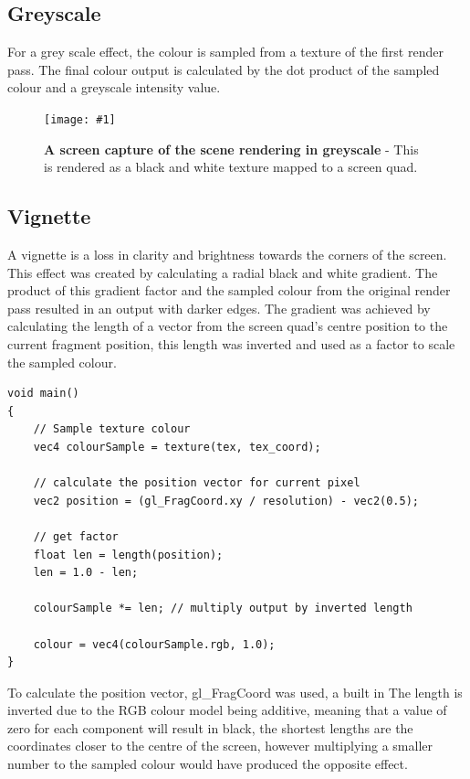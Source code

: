 \documentclass[conference]{acmsiggraph}
\newcommand{\figuremacroW}[4]{
	\begin{figure}[h] %
		\centering
		\texttt{[image: \#1]}
		\caption[#2]{\textbf{#2} - #3}
		\label{fig:#1}
	\end{figure}
}
\begin{document}
\subsection{Greyscale}

For a grey scale effect, the colour is sampled from a texture of the first render pass. The final colour output is calculated by the dot product of the sampled colour and a greyscale intensity value.

\figuremacroW
{greyscale}
{A screen capture of the scene rendering in greyscale}
{This is rendered as a black and white texture mapped to a screen quad.}
{1.0}

\subsection{Vignette}

A vignette is a loss in clarity and brightness towards the corners of the screen. This effect was created by calculating a radial black and white gradient. The product of this gradient factor and the sampled colour from the original render pass resulted in an output with darker edges. The gradient was achieved by calculating the length of a vector from the screen quad's centre position to the current fragment position, this length was inverted and used as a factor to scale the sampled colour. 

\begin{lstlisting}[label = {lst:vignette}, caption={Fragment Shader Code Snippet for Vignette Calculation}]
void main()
{
	// Sample texture colour
	vec4 colourSample = texture(tex, tex_coord);

	// calculate the position vector for current pixel
	vec2 position = (gl_FragCoord.xy / resolution) - vec2(0.5);

	// get factor
	float len = length(position);
	len = 1.0 - len;

	colourSample *= len; // multiply output by inverted length

	colour = vec4(colourSample.rgb, 1.0);
}
\end{lstlisting}

To calculate the position vector, gl_FragCoord was used, a built in
The length is inverted due to the RGB colour model being additive, meaning that a value of zero for each component will result in black, the shortest lengths are the coordinates closer to the centre of the screen, however multiplying a smaller number to the sampled colour would have produced the opposite effect.
\end{document}
